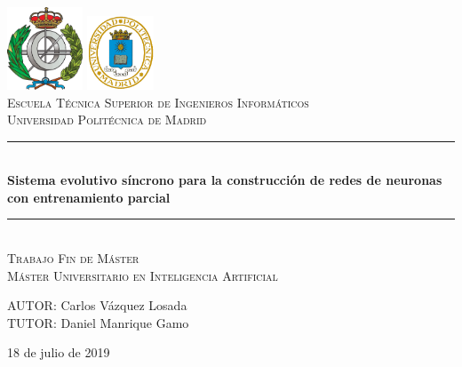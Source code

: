 \documentclass[spanish,a4paper,12pt,twoside]{report}
\begin{document}
  \begin{titlepage}
    \newcommand{\HRule}{\rule{\linewidth}{0.5mm}}
    \begin{center}
      \includegraphics[width = 2.25cm]{resources/FACINFO}
      \hspace{8cm}
      \includegraphics[width = 2cm]{resources/logoupm.png}
      \\[1cm]

      \textsc{\Large Escuela Técnica Superior de Ingenieros Informáticos}
      \\[0.5cm]
      \textsc{\large Universidad Politécnica de Madrid}
      \\[3cm]

      \HRule \\[0.4cm]
      {\huge \bfseries Sistema evolutivo síncrono para la construcción de redes de neuronas con entrenamiento parcial}
      \HRule \\[4cm]
    
      \textsc{\LARGE Trabajo Fin de Máster}\\[0.5cm]
      \textsc{\Large Máster Universitario en Inteligencia Artificial}\\[3cm]
    \end{center}
    \begin{flushright}
      \large AUTOR: Carlos Vázquez Losada \\TUTOR: Daniel Manrique Gamo
      \\[2.1cm]
    \end{flushright}
    \begin{center}
      {{18 de julio de 2019}}
    \end{center}
    \vfill
  \end{titlepage}
  \newpage\cleardoublepage
  
\end{document}
